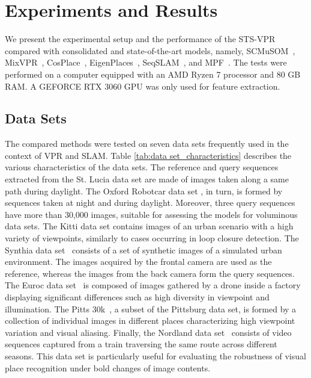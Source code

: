 \documentclass[letterpaper, 10 pt, conference]{ieeeconf}  %
\begin{document}
\section{Experiments and Results}



We present the experimental setup and the performance of the STS-VPR compared with consolidated and state-of-the-art models, namely, SCMuSOM~\cite{scmusom}, MixVPR~\cite{mixvpr}, CosPlace~\cite{CosPlace}, EigenPlaces~\cite{EigenPlaces}, SeqSLAM~\cite{seqslam}, and MPF~\cite{mpf}. The tests were performed on a computer equipped with an AMD Ryzen 7 processor and 80 GB RAM. A GEFORCE RTX 3060 GPU was only used for feature extraction.



\subsection{Data Sets}





The compared methods were tested on seven data sets frequently used in the context of VPR and SLAM. Table \ref{tab:data set_characteristics} describes the various characteristics of the data sets. The reference and query sequences extracted from the St. Lucia data set \cite{st_lucia} are made of images taken along a same path during daylight. The Oxford Robotcar data set \cite{oxfordrobotcar}, in turn, is formed by sequences taken at night and during daylight. Moreover, three query sequences have more than 30,000 images, suitable for assessing the models for voluminous data sets. The Kitti data set \cite{kitti} contains images of an urban scenario with a high variety of viewpoints, similarly to cases occurring in loop closure detection. The Synthia data set~\cite{synthia} consists of a set of synthetic images of a simulated urban environment. The images acquired by the frontal camera are used as the reference, whereas the images from the back camera form the query sequences. The Euroc data set~\cite{euroc} is composed of images gathered by a drone inside a factory displaying significant differences such as high diversity in viewpoint and illumination. The Pitts 30k~\cite{pitts}, a subset of the Pittsburg data set, is formed by a collection of individual images in different places characterizing high viewpoint variation and visual aliasing. Finally, the Nordland data set~\cite{nordland} consists of video sequences captured from a train traversing the same route across different seasons. This data set is particularly useful for evaluating the robustness of visual place recognition under bold changes of image contents. 
\end{document}
